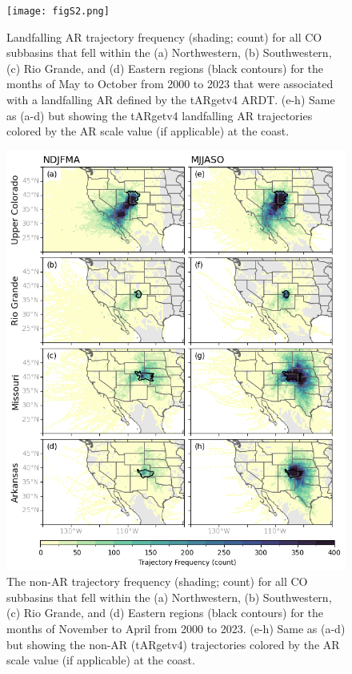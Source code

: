\documentclass[draft,jgrga]{agutexSI2019}
\begin{document}
\begin{article}
\begin{figure}
\noindent\texttt{[image: figS2.png]}
\caption{Landfalling AR trajectory frequency (shading; count) for all CO subbasins that fell within the (a) Northwestern, (b) Southwestern, (c) Rio Grande, and (d) Eastern regions (black contours) for the months of May to October from 2000 to 2023 that were associated with a landfalling AR defined by the tARgetv4 ARDT. (e-h) Same as (a-d) but showing the tARgetv4 landfalling AR trajectories colored by the AR scale value (if applicable) at the coast.}
\label{fig:supp:heatmap_spaghetti_MJJASO_tARget}
\end{figure}

\begin{figure}
\noindent\includegraphics[scale=0.8]{figS3.png}
\caption{The non-AR trajectory frequency (shading; count) for all CO subbasins that fell within the (a) Northwestern, (b) Southwestern, (c) Rio Grande, and (d) Eastern regions (black contours) for the months of November to April from 2000 to 2023. (e-h) Same as (a-d) but showing the non-AR (tARgetv4) trajectories colored by the AR scale value (if applicable) at the coast.}
\label{fig:supp:heatmap_spaghetti_NDJFMA_no-AR_tARget}
\end{figure}


\end{article}
\end{document}
